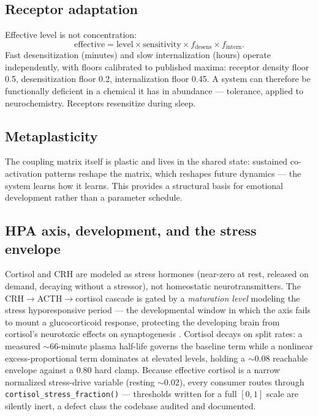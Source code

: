 \documentclass[11pt]{article}
\newcommand{\code}[1]{\texttt{\small #1}}
\begin{document}
\subsection{Receptor adaptation}

Effective level is not concentration:
\[
\mathrm{effective} = \mathrm{level} \times \mathrm{sensitivity}
\times f_{\mathrm{desens}} \times f_{\mathrm{intern}}.
\]
Fast desensitization (minutes) and slow internalization (hours) operate
independently, with floors calibrated to published maxima: receptor
density floor 0.5, desensitization floor 0.2, internalization floor
0.45. A system can therefore be functionally deficient in a chemical it
has in abundance --- tolerance, applied to neurochemistry. Receptors
resensitize during sleep.

\subsection{Metaplasticity}

The coupling matrix itself is plastic and lives in the shared state:
sustained co-activation patterns reshape the matrix, which reshapes
future dynamics --- the system learns how it learns. This provides a
structural basis for emotional development rather than a parameter
schedule.

\subsection{HPA axis, development, and the stress envelope}

Cortisol and CRH are modeled as stress hormones (near-zero at rest,
released on demand, decaying without a stressor), not homeostatic
neurotransmitters. The CRH$\to$ACTH$\to$cortisol cascade is gated by a
\emph{maturation level} modeling the stress hyporesponsive period ---
the developmental window in which the axis fails to mount a
glucocorticoid response, protecting the developing brain from
cortisol's neurotoxic effects on synaptogenesis \cite{schmidt,gunnar}. Cortisol decays on
split rates: a measured $\sim$66-minute plasma half-life governs the
baseline term while a nonlinear excess-proportional term dominates at
elevated levels, holding a $\sim$0.08 reachable envelope against a 0.80
hard clamp. Because effective cortisol is a narrow normalized
stress-drive variable (resting $\sim$0.02), every consumer routes
through \code{cortisol\_stress\_fraction()} --- thresholds written for
a full $[0,1]$ scale are silently inert, a defect class the codebase
audited and documented.
\end{document}
